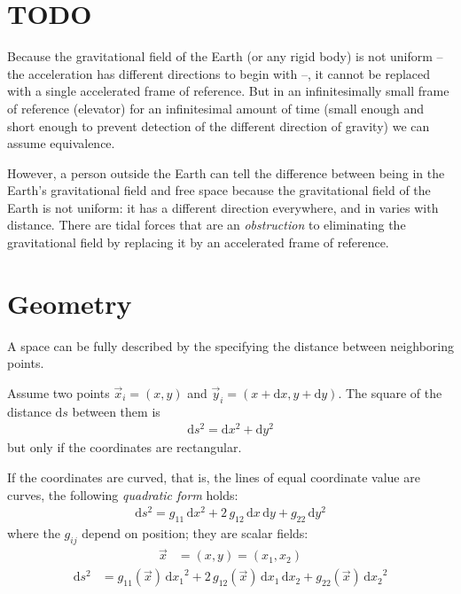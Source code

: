 \documentclass[pagesize,headsepline,10pt,parskip=half,BCOR=12mm]{scrreprt}
\begin{document}
    \section{TODO}
      Because the gravitational field of the Earth (or any rigid
      body) is not uniform -- the acceleration has different
      directions to begin with --, it cannot be replaced with a
      single accelerated frame of reference.  But in an
      infinitesimally small frame of reference (elevator) for an
      infinitesimal amount of time (small enough and short enough
      to prevent detection of the different direction of gravity)
      we can assume equivalence.

      However, a person outside the Earth can tell the difference
      between being in the Earth's gravitational field and free
      space because the gravitational field of the Earth is not
      uniform: it has a different direction everywhere, and in
      varies with distance.  There are tidal forces that are an
      \emph{obstruction} to eliminating the gravitational field by
      replacing it by an accelerated frame of reference.

    \section{Geometry}
      A space can be fully described by the specifying the distance
      between neighboring points.

      Assume two points $\vec x_i = (x, y)$ and $\vec y_i = (x +
      \mathrm{d}x, y + \mathrm{d}y)$.  The square of the distance $\mathrm{d}s$
      between them is
      \begin{align}\label{eq:flat}
        \mathrm{d}s^2 = \mathrm{d}x^2 + \mathrm{d}y^2
      \end{align}
      but only if the coordinates are rectangular.

      If the coordinates are curved, that is, the lines of equal
      coordinate value are curves, the following \emph{quadratic
      form} holds:
      \begin{align*}
        \mathrm{d}s^2 = g_{11}\,\mathrm{d}x^2 + 2\,g_{12}\,
        \mathrm{d}x\,\mathrm{d}y + g_{22}\,\mathrm{d}y^2
      \end{align*}
      where the $g_{ij}$ depend on position; they are scalar
      fields:
      \begin{align*}
        \vec x &= (x, y) = (x_1, x_2)
      \end{align*}
      \begin{align}
        \mathrm{d}s^2 &= g_{11}(\vec x)\,{\mathrm{d}x_1}^2 + 2\,
        g_{12}(\vec x)\,\mathrm{d}x_1\,\mathrm{d}x_2 + g_{22}(\vec
        x)\,{\mathrm{d}x_2}^2
      \end{align}
\end{document}
